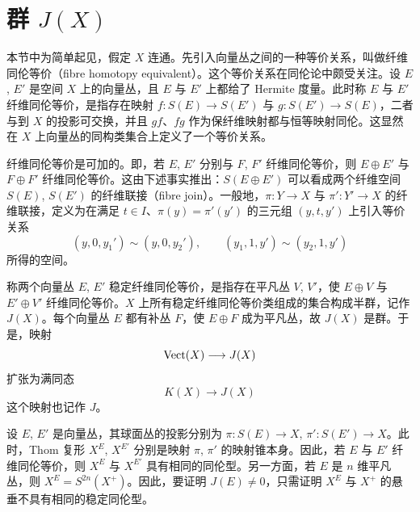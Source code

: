 \section{群 $J(X)$}


本节中为简单起见，假定 $X$ 连通。先引入向量丛之间的一种等价关系，叫做纤维同伦等价（fibre homotopy equivalent）。这个等价关系在同伦论中颇受关注。设 $E$, $E'$ 是空间 $X$ 上的向量丛，且 $E$ 与 $E'$ 上都给了 Hermite 度量。此时称 $E$ 与 $E'$ 纤维同伦等价，是指存在映射 $f: S(E)\to S(E')$ 与 $g: S(E')\to S(E)$，二者与到 $X$ 的投影可交换，并且 $gf$、$fg$ 作为保纤维映射都与恒等映射同伦。这显然在 $X$ 上向量丛的同构类集合上定义了一个等价关系。

纤维同伦等价是可加的。即，若 $E$, $E'$ 分别与 $F$, $F'$ 纤维同伦等价，则 $E\oplus E'$ 与 $F\oplus F'$ 纤维同伦等价。这由下述事实推出：$S(E\oplus E')$ 可以看成两个纤维空间 $S(E)$, $S(E')$ 的纤维联接（fibre join）。一般地，$\pi: Y\to X$ 与 $\pi': Y'\to X$ 的纤维联接，定义为在满足 $t\in I$、$\pi(y)=\pi'(y')$ 的三元组 $(y,t,y')$ 上引入等价关系
\begin{equation*}
  (y,0,y_1')\sim(y,0,y_2'),\qquad (y_1,1,y')\sim(y_2,1,y')
\end{equation*}
所得的空间。

称两个向量丛 $E$, $E'$ 稳定纤维同伦等价，是指存在平凡丛 $V$, $V'$，使 $E\oplus V$ 与 $E'\oplus V'$ 纤维同伦等价。$X$ 上所有稳定纤维同伦等价类组成的集合构成半群，记作 $J(X)$。每个向量丛 $E$ 都有补丛 $F$，使
$E\oplus F$ 成为平凡丛，故 $J(X)$ 是群。于是，映射
\begin{equation*}
  \operatorname{Vect}(X)\longrightarrow J(X)
\end{equation*}
扩张为满同态
\begin{equation*}
  K(X)\longrightarrow J(X)
\end{equation*}
这个映射也记作 $J$。

设 $E$, $E'$ 是向量丛，其球面丛的投影分别为 $\pi: S(E)\to X$, $\pi': S(E')\to X$。此时，Thom 复形 $X^E$, $X^{E'}$ 分别是映射 $\pi$, $\pi'$ 的映射锥本身。因此，若 $E$ 与 $E'$ 纤维同伦等价，则 $X^E$ 与 $X^{E'}$ 具有相同的同伦型。另一方面，若 $E$ 是 $n$ 维平凡丛，则 $X^E=S^{2n}(X^+)$。因此，要证明 $J(E)\neq0$，只需证明 $X^E$ 与 $X^+$ 的悬垂不具有相同的稳定同伦型。

